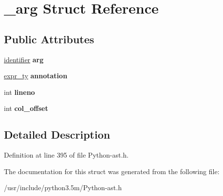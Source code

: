 \hypertarget{struct__arg}{}\section{\+\_\+arg Struct Reference}
\label{struct__arg}
\subsection*{Public Attributes}
\begin{DoxyCompactItemize}
\item 
\hyperlink{struct__object}{identifier} {\bfseries arg}\hypertarget{struct__arg_aad5347770aa785fef3e5409b64f7d67d}{}\label{struct__arg_aad5347770aa785fef3e5409b64f7d67d}

\item 
\hyperlink{struct__expr}{expr\+\_\+ty} {\bfseries annotation}\hypertarget{struct__arg_ac0f554cceab04b9ec1ccdf6f85f3dab0}{}\label{struct__arg_ac0f554cceab04b9ec1ccdf6f85f3dab0}

\item 
int {\bfseries lineno}\hypertarget{struct__arg_add3f4d65a7b6dc84c56cb6dfe149afec}{}\label{struct__arg_add3f4d65a7b6dc84c56cb6dfe149afec}

\item 
int {\bfseries col\+\_\+offset}\hypertarget{struct__arg_a5c8a9825e327ffbc19c6585f02930fff}{}\label{struct__arg_a5c8a9825e327ffbc19c6585f02930fff}

\end{DoxyCompactItemize}


\subsection{Detailed Description}


Definition at line 395 of file Python-\/ast.\+h.



The documentation for this struct was generated from the following file\+:\begin{DoxyCompactItemize}
\item 
/usr/include/python3.\+5m/Python-\/ast.\+h\end{DoxyCompactItemize}
